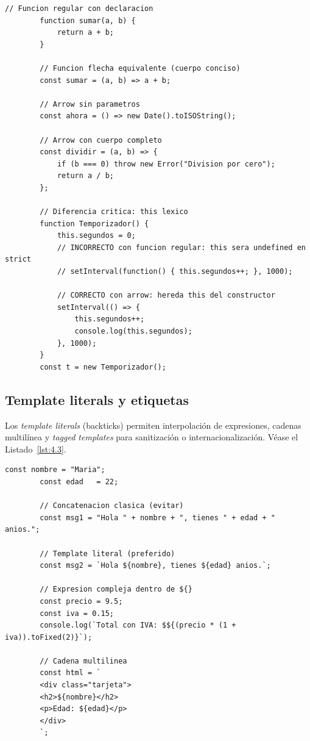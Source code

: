 \documentclass[11pt,a4paper,openany]{book}
\begin{document}
	\begin{lstlisting}[style=js,caption={Funciones regulares vs.\ funciones flecha},
		label=lst:4.2]
		// Funcion regular con declaracion
		function sumar(a, b) {
			return a + b;
		}
		
		// Funcion flecha equivalente (cuerpo conciso)
		const sumar = (a, b) => a + b;
		
		// Arrow sin parametros
		const ahora = () => new Date().toISOString();
		
		// Arrow con cuerpo completo
		const dividir = (a, b) => {
			if (b === 0) throw new Error("Division por cero");
			return a / b;
		};
		
		// Diferencia critica: this lexico
		function Temporizador() {
			this.segundos = 0;
			// INCORRECTO con funcion regular: this sera undefined en strict
			// setInterval(function() { this.segundos++; }, 1000);
			
			// CORRECTO con arrow: hereda this del constructor
			setInterval(() => {
				this.segundos++;
				console.log(this.segundos);
			}, 1000);
		}
		const t = new Temporizador();
	\end{lstlisting}
	
	\subsection{Template literals y etiquetas}
	\label{sub:4.template}
	
	Los \emph{template literals} (backticks) permiten interpolación
	de expresiones, cadenas multilínea y \emph{tagged templates} para
	sanitización o internacionalización. Véase el Listado~\ref{lst:4.3}.
	
	\begin{lstlisting}[style=js,numbers=none,caption={Template literals},label=lst:4.3]
		const nombre = "Maria";
		const edad   = 22;
		
		// Concatenacion clasica (evitar)
		const msg1 = "Hola " + nombre + ", tienes " + edad + " anios.";
		
		// Template literal (preferido)
		const msg2 = `Hola ${nombre}, tienes ${edad} anios.`;
		
		// Expresion compleja dentro de ${}
		const precio = 9.5;
		const iva = 0.15;
		console.log(`Total con IVA: $${(precio * (1 + iva)).toFixed(2)}`);
		
		// Cadena multilinea
		const html = `
		<div class="tarjeta">
		<h2>${nombre}</h2>
		<p>Edad: ${edad}</p>
		</div>
		`;
	\end{lstlisting}
	
\end{document}
